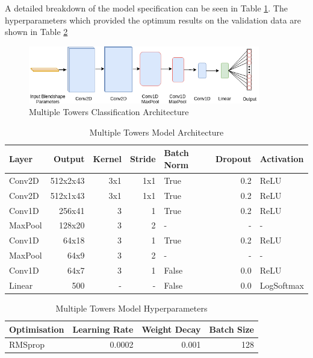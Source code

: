 A detailed breakdown of the model specification can be seen in Table \ref{table:multi_towers_classifier}.
The hyperparameters which provided the optimum results on the validation data are shown in Table \ref{table:multi_towers_classifier_hyperparameters} 

\begin{figure}[h!]
    \centering
        \includegraphics[width=0.9\textwidth]{figures/classification/blendshape_multi_tower_arch.png}
    \caption{Multiple Towers Classification Architecture}\label{fig:Blendshape_Multiple_Towers}
\end{figure}
\quad

\begin{table}[h!]
\centering
    \begin{tabular}{l | r | r | r | l | r | l}
    \textbf{Layer} & \textbf{Output} & \textbf{Kernel} & \textbf{Stride} & \textbf{Batch Norm} & \textbf{Dropout} & \textbf{Activation} \\ \hline
    Conv2D & 512x2x43 & 3x1 & 1x1 & True & 0.2 & ReLU \\ \hline
    Conv2D & 512x1x43 & 3x1 & 1x1 & True & 0.2 & ReLU \\ \hline
    Conv1D & 256x41 & 3 & 1 & True & 0.2 & ReLU \\ \hline
    MaxPool & 128x20 & 3 & 2 & - & - & - \\ \hline
    Conv1D & 64x18 & 3 & 1 & True & 0.2 & ReLU \\ \hline
    MaxPool & 64x9 & 3 & 2 & - & - & - \\ \hline
    Conv1D & 64x7 & 3 & 1 & False & 0.0 & ReLU \\ \hline
    Linear & 500 & - & - & False & 0.0 & LogSoftmax \\
    \end{tabular} 
    \caption{Multiple Towers Model Architecture}\label{table:multi_towers_classifier}
\end{table}
\quad

\begin{table}[h!]
\centering
    \begin{tabular}{l | r | r | r}
    \textbf{Optimisation} & \textbf{Learning Rate} & \textbf{Weight Decay} & \textbf{Batch Size} \\ \hline
    RMSprop & 0.0002 & 0.001 & 128 \\
    \end{tabular} 
    \caption{Multiple Towers Model Hyperparameters}\label{table:multi_towers_classifier_hyperparameters}
\end{table}


